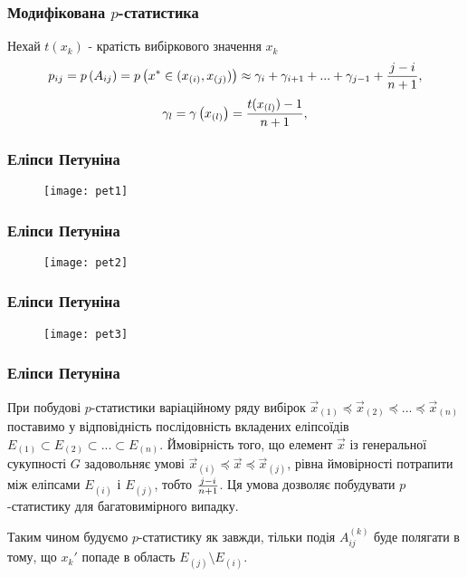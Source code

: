 \documentclass[mathserif,serif,10pt]{beamer}
\begin{document}
\begin{frame}
\frametitle{Модифікована $p$-статистика}
Нехай $t(x_k)$ - кратість вибіркового значення $x_k$
\[
p_{ij}=p\left(A_{ij}\right)=p\left(x^{*} \in (x_{(i)}, x_{(j)})\right) \approx
\gamma_i + \gamma_{i+1} + ... + \gamma_{j-1} + {{j-i}\over{n+1}},
\]
\[\gamma_{l} = \gamma \left(x_{(l)}\right) = {{t(x_{(l)})-1}\over{n+1}},\]
\end{frame}

\begin{frame}
\frametitle{Еліпси Петуніна}
\begin{figure}[h!]
\centering
\texttt{[image: pet1]}
\end{figure}
\end{frame}

\begin{frame}
\frametitle{Еліпси Петуніна}
\begin{figure}[h!]
\centering
\texttt{[image: pet2]}
\end{figure}
\end{frame}

\begin{frame}
\frametitle{Еліпси Петуніна}
\begin{figure}[h!]
\centering
\texttt{[image: pet3]}
\end{figure}
\end{frame}

\begin{frame}
\frametitle{Еліпси Петуніна}
При побудові $p$-статистики варіаційному ряду вибірок
$\overrightarrow{x}_{(1)} \preceq \overrightarrow{x}_{(2)} \preceq
... \preceq \overrightarrow{x}_{(n)}$ поставимо у відповідність послідовність
вкладених еліпсоїдів $E_{(1)} \subset E_{(2)} \subset ... \subset E_{(n)}$. Ймовірність того, що елемент $\overrightarrow{x}$ із генеральної сукупності $G$ задовольняє умові $\overrightarrow{x}_{(i)} \preceq \overrightarrow{x} \preceq
\overrightarrow{x}_{(j)}$, рівна ймовірності потрапити між еліпсами $E_{(i)}$ і $E_{(j)}$, тобто $j-i \over n+1$. Ця умова дозволяє побудувати $p$-статистику для багатовимірного випадку. \par
Таким чином будуємо $p$-статистику як завжди, тільки подія $A_{ij}^{(k)}$ буде полягати в тому, що $x_k'$ попаде в область $E_{(j)} \setminus E_{(i)}$.
\end{frame}
\end{document}

